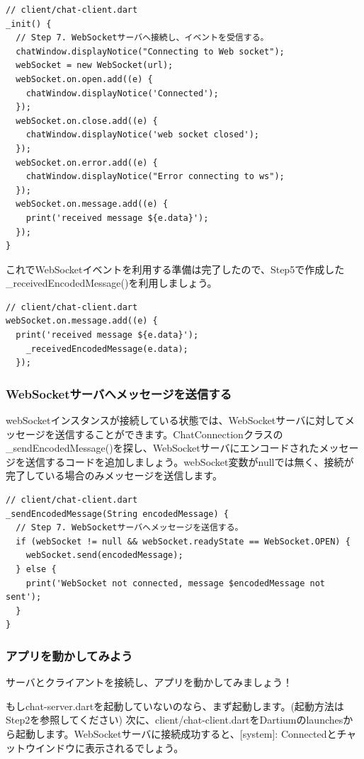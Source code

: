 \begin{verbatim}
// client/chat-client.dart
_init() {
  // Step 7. WebSocketサーバへ接続し、イベントを受信する。
  chatWindow.displayNotice("Connecting to Web socket");
  webSocket = new WebSocket(url);
  webSocket.on.open.add((e) {
    chatWindow.displayNotice('Connected');
  });
  webSocket.on.close.add((e) {
    chatWindow.displayNotice('web socket closed');
  });
  webSocket.on.error.add((e) {
    chatWindow.displayNotice("Error connecting to ws");
  });
  webSocket.on.message.add((e) {
    print('received message ${e.data}');
  });
}
\end{verbatim}

これでWebSocketイベントを利用する準備は完了したので、Step5で作成した\_receivedEncodedMessage()を利用しましょう。

\begin{verbatim}
// client/chat-client.dart
webSocket.on.message.add((e) {
  print('received message ${e.data}');
    _receivedEncodedMessage(e.data);
  });
\end{verbatim}

\subsubsection{WebSocketサーバへメッセージを送信する}

webSocketインスタンスが接続している状態では、WebSocketサーバに対してメッセージを送信することができます。ChatConnectionクラスの\_sendEncodedMessage()を探し、WebSocketサーバにエンコードされたメッセージを送信するコードを追加しましょう。webSocket変数がnullでは無く、接続が完了している場合のみメッセージを送信します。

\begin{verbatim}
// client/chat-client.dart
_sendEncodedMessage(String encodedMessage) {
  // Step 7. WebSocketサーバへメッセージを送信する。
  if (webSocket != null && webSocket.readyState == WebSocket.OPEN) {
    webSocket.send(encodedMessage);
  } else {
    print('WebSocket not connected, message $encodedMessage not sent');
  }
}
\end{verbatim}

\subsubsection{アプリを動かしてみよう}

サーバとクライアントを接続し、アプリを動かしてみましょう！

もしchat-server.dartを起動していないのなら、まず起動します。(起動方法はStep2を参照してください) 次に、client/chat-client.dartをDartiumのlaunchesから起動します。WebSocketサーバに接続成功すると、[system]: Connectedとチャットウインドウに表示されるでしょう。

